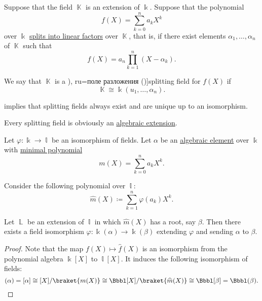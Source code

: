 \begin{definition}\label{def:splitting_field}
  Suppose that the field \( \BbbK \) is an extension of \( \Bbbk \). Suppose that the polynomial
  \begin{equation*}
     f(X) = \sum_{k=0}^n a_k X^k
  \end{equation*}
  over \( \Bbbk \) \hyperref[def:polynomial_splits_into_linear_factors]{splits into linear factors} over \( \BbbK \), that is, if there exist elements \( \alpha_1, \ldots, \alpha_n \) of \( \BbbK \) such that
  \begin{equation*}
    f(X) = a_n \prod_{k=1}^n (X - \alpha_k).
  \end{equation*}

  We say that \( \BbbK \) is a \term[bg=поле на разлагане (\cite[429]{Обрешков1962ВисшаАлгебра}), ru=поле разложения (\cite[def. 9.5.2]{Винберг2014КурсАлгебры})]{splitting field} for \( f(X) \) if
  \begin{equation*}
    \BbbK \cong \Bbbk(u_1, \ldots, \alpha_n).
  \end{equation*}
\end{definition}
\begin{comments}
  \item {} implies that splitting fields always exist and are unique up to an isomorphism.
  \item Every splitting field is obviously an \hyperref[def:algebraic_extension]{algebraic extension}.
\end{comments}

\begin{lemma}\label{thm:splitting_field_uniqueness_step}
  Let \( \varphi: \Bbbk \to \Bbbl \) be an isomorphism of fields. Let \( \alpha \) be an \hyperref[def:algebraic_element]{algebraic element} over \( \Bbbk \) with \hyperref[def:algebraic_element_minimal_polynomial]{minimal polynomial}
  \begin{equation*}
     m(X) = \sum_{k=0}^n a_k X^k.
  \end{equation*}

  Consider the following polynomial over \( \Bbbl \):
  \begin{equation*}
    \widehat{m}(X) \coloneqq \sum_{k=1}^n \varphi(a_k) X^k.
  \end{equation*}

  Let \( \BbbL \) be an extension of \( \Bbbl \) in which \( \widehat{m}(X) \) has a root, say \( \beta \). Then there exists a field isomorphism \( \varphi: \Bbbk(\alpha) \to \Bbbk(\beta) \) extending \( \varphi \) and sending \( \alpha \) to \( \beta \).
\end{lemma}
\begin{proof}
  Note that the map \( f(X) \mapsto \widehat{f}(X) \) is an isomorphism from the polynomial algebra \( \Bbbk[X] \) to \( \Bbbl[X] \). It induces the following isomorphism of fields:
  \begin{equation*}
    \Bbbk(\alpha) = \Bbbk[\alpha] \cong \Bbbk[X] / \braket{ m(X) } \cong \Bbbl[X] / \braket{ \widehat{m}(X) } \cong \Bbbl[\beta] = \Bbbl(\beta).
  \end{equation*}
\end{proof}

